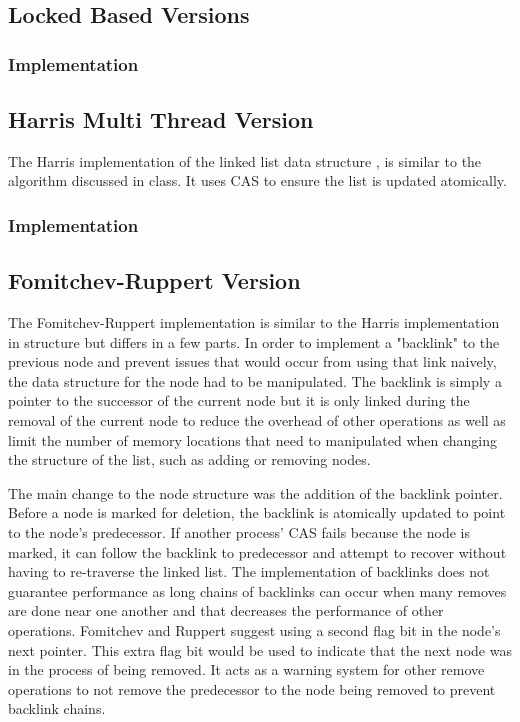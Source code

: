 \subsection{Locked Based Versions}
\subsubsection{Implementation}

\subsection{Harris Multi Thread Version}
The Harris implementation of the linked list data structure \cite{Harris:2001:PIN:645958.676105}, is similar to the algorithm discussed in class. It uses CAS to ensure the list is updated atomically.
\subsubsection{Implementation}

\subsection{Fomitchev-Ruppert Version}
The Fomitchev-Ruppert implementation \cite{Fomitchev:2004:LLL:1011767.1011776} is similar to the Harris implementation in structure but differs in a few parts. In order to implement a "backlink" to the previous node and prevent issues that would occur from using that link naively, the data structure for the node had to be manipulated. The backlink is simply a pointer to the successor of the current node but it is only linked during the removal of the current node to reduce the overhead of other operations as well as limit the number of memory locations that need to manipulated when changing the structure of the list, such as adding or removing nodes.

The main change to the node structure was the addition of the backlink pointer. Before a node is marked for deletion, the backlink is atomically updated to point to the node's predecessor. If another process' CAS fails because the node is marked, it can follow the backlink to predecessor and attempt to recover without having to re-traverse the linked list. The implementation of backlinks does not guarantee performance as long chains of backlinks can occur when many removes are done near one another and that decreases the performance of other operations. Fomitchev and Ruppert suggest using a second flag bit in the node's next pointer. This extra flag bit would be used to indicate that the next node was in the process of being removed. It acts as a warning system for other remove operations to not remove the predecessor to the node being removed to prevent backlink chains.


